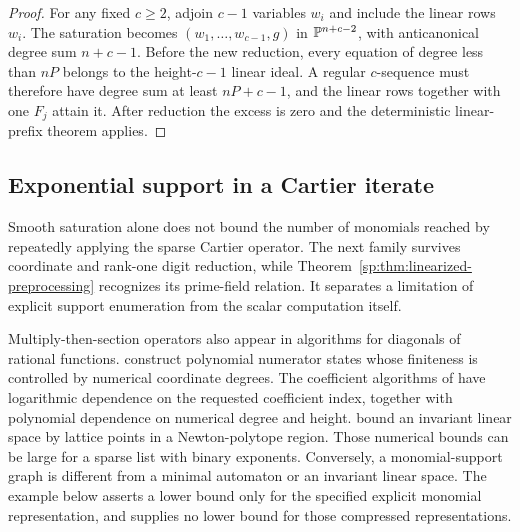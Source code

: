 \begin{proof}
For any fixed $c\ge2$, adjoin $c-1$ variables $w_i$ and include the
linear rows $w_i$. The saturation becomes $(w_1,\ldots,w_{c-1},g)$
in $\mathbb P^{n+c-2}$, with anticanonical degree sum $n+c-1$.
Before the new reduction, every equation of degree less than $nP$
belongs to the height-$c-1$ linear ideal. A regular $c$-sequence must
therefore have degree sum at least $nP+c-1$, and the linear rows
together with one $F_j$ attain it. After reduction the excess is zero
and the deterministic linear-prefix theorem applies.
\end{proof}

\subsection{Exponential support in a Cartier iterate}
Smooth saturation alone does not bound the number of monomials
reached by repeatedly applying the sparse Cartier operator. The next
family survives coordinate and rank-one digit reduction, while
Theorem~\ref{sp:thm:linearized-preprocessing} recognizes its
prime-field relation. It separates a limitation of explicit support
enumeration from the scalar computation itself.

Multiply-then-section operators also appear in algorithms for
diagonals of rational functions. \citet[Definition~1.7,
Proposition~1.9, Algorithm~1 and Remark~2.2, pp.~249--254]{sp-rowland-yassawi}
construct polynomial numerator states whose finiteness is controlled
by numerical coordinate degrees. The coefficient algorithms of
\citet[Theorems~3.4 and~4.1, author pp.~9--11]{sp-bccd} have
logarithmic dependence on the requested coefficient index, together
with polynomial dependence on numerical degree and height.
\citet[Theorem~1.2 and Corollary~1.4, pp.~4--5; \S2.3]{sp-effective-christol}
bound an invariant linear space by lattice points in a Newton-polytope
region. Those numerical bounds can be large for a sparse list with
binary exponents. Conversely, a monomial-support graph is different
from a minimal automaton or an invariant linear space. The example
below asserts a lower bound only for the specified explicit monomial
representation, and supplies no lower bound for those compressed
representations.

